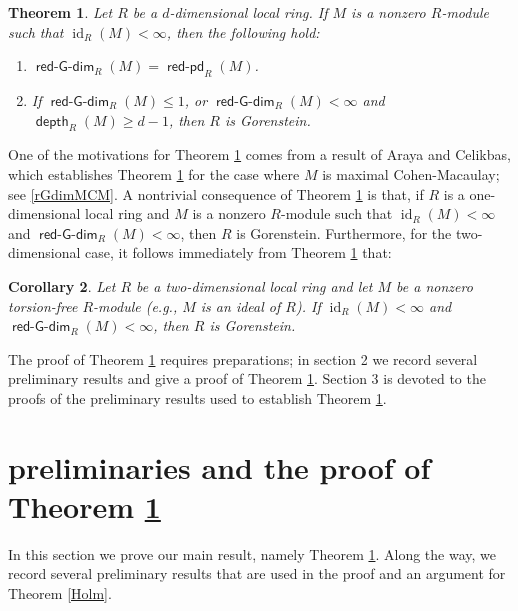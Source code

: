 \documentclass{amsart}
\theoremstyle{plain} %
\newtheorem{thm}{Theorem}[section]
\newtheorem{cor}[thm]{Corollary}
\theoremstyle{definition}
\DeclareMathOperator{\id}{id}
\def\depth{\operatorname{\mathsf{depth}}}
\DeclareMathOperator{\rGdim}{\operatorname{\mathsf{red-G-dim}}}
\DeclareMathOperator{\rpdim}{\operatorname{\mathsf{red-pd}}}
\begin{document}
\begin{thm} \label{mainthm} Let $R$ be a $d$-dimensional local ring. If $M$ is a nonzero $R$-module such that $\id_R(M)<\infty$, then the following hold:
\begin{enumerate}[\rm(i)]
\item $\rGdim_R(M)=\rpdim_R(M)$.
\item If $\rGdim_R(M) \leq 1$, or $\rGdim_R(M)<\infty$ and $\depth_R(M)\geq d-1$, then $R$ is Gorenstein.
\end{enumerate}
\end{thm}

One of the motivations for Theorem \ref{mainthm} comes from a result of Araya and Celikbas, which establishes Theorem \ref{mainthm} for the case where $M$ is maximal Cohen-Macaulay; see \ref{rGdimMCM}.
A nontrivial consequence of Theorem \ref{mainthm} is that, if $R$ is a one-dimensional local ring and $M$ is a nonzero $R$-module such that $\id_R(M)<\infty$ and $\rGdim_R(M)<\infty$, then $R$ is Gorenstein. Furthermore, for the two-dimensional case, it follows immediately from Theorem \ref{mainthm} that:

\begin{cor} Let $R$ be a two-dimensional local ring and let $M$ be a nonzero torsion-free $R$-module (e.g., $M$ is an ideal of $R$). If $\id_R(M)<\infty$ and $\rGdim_R(M)<\infty$, then $R$ is Gorenstein.
\end{cor}

The proof of Theorem \ref{mainthm} requires preparations; in section 2 we record several preliminary results and give a proof of Theorem \ref{mainthm}. Section 3 is devoted to the proofs of the preliminary results used to establish Theorem \ref{mainthm}.

\section{preliminaries and the proof of Theorem \ref{mainthm}}

In this section we prove our main result, namely Theorem \ref{mainthm}.  Along the way, we record several preliminary results that are used in the proof and an argument for Theorem \ref{Holm}.

\end{document}
